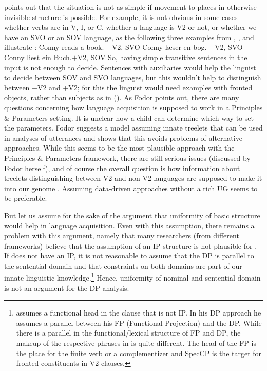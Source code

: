 \documentclass[output=paper
  ,nobabel
  ,draftmode
  ,uniformtopskip %
  ,colorlinks, citecolor=brown
]{langscibook}
\begin{document}
\citet[739]{Fodor2001b} points out that the situation is not as simple if movement to places in
otherwise invisible structure is possible. For example, it is not obvious in some cases whether
verbs are in V, I, or C, whether a language is V2 or not, or whether we have an SVO or an SOV
language, as the following three examples from , , and  illustrate
\citep[Section~6.2.2, Figure~6.11]{MuellerGermanic}:
\eal
\ex Conny reads a book. \hfill $-$V2, SVO
\ex Conny læser en bog. \hfill $+$V2, SVO
\ex Conny liest ein Buch.\hfill $+$V2, SOV
\zl
\largerpage
So, having simple transitive sentences in the input is not enough to decide. Sentences with
auxiliaries would help the linguist to decide between SOV and SVO languages, but this wouldn't help
to distinguish between $-$V2 and $+$V2; for this the linguist would need examples with fronted
objects, rather than subjects as in (). As Fodor
points out, there are many questions concerning
how language acquisition is supposed to work in a Principles \& Parameters setting. It is unclear
how a child can determine which way to set the parameters. Fodor suggests a model assuming innate treelets
that can be used in analyses of utterances and shows that this avoids problems of alternative
approaches. While this seems to be the most plausible approach with the Principles \& Parameters
framework, there are still serious issues (discussed by Fodor herself), and of course the overall
question is how information about treelets distinguishing between V2 and non-V2 languages are
supposed to make it into our genome \citep*{HCF2002a}. Assuming data-driven approaches without a rich
UG \citep{FPAG2007a} seems to be preferable.  
 
But let us assume for the sake of the argument that uniformity of basic \xbar structure
would help in language acquisition. Even with this assumption, there remains a problem with this argument, namely that many
researchers (from different frameworks) believe that the assumption of an IP structure is not plausible for 
\citep{BK90a,Haider93a,Berman2003a}. If  does not have an IP, it is not reasonable to assume
that the DP is parallel to the sentential domain and that constraints on both domains are part of
our innate linguistic knowledge.\footnote{%
  \citet{Haider92b} assumes a functional head in the  clause that is not IP. In his DP approach
  he assumes a parallel between his FP (Functional Projection) and the DP. While there is a parallel in the
  functional/lexical structure of FP and DP, the makeup of the respective phrases in  is quite
  different. The head of the FP is the place for the finite verb or a complementizer and SpecCP is
  the target for fronted constituents in V2 clauses.%
} Hence, uniformity of nominal and sentential domain is not an
argument for the DP analysis.
\end{document}
